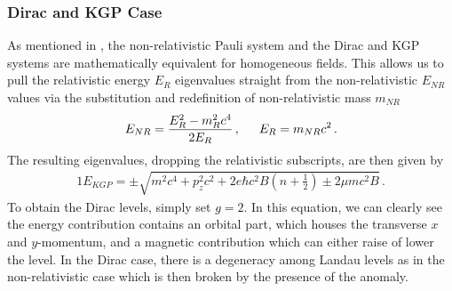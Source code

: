 \subsubsection*{Dirac and KGP Case}\label{ajsss:DKGP}
\noindent As mentioned in , the non-relativistic Pauli system and the Dirac and KGP systems are mathematically equivalent for homogeneous fields. This allows us to pull the relativistic energy $E_{R}$ eigenvalues straight from the non-relativistic $E_{NR}$ values via the substitution and redefinition of non-relativistic mass $m_{NR}$
\begin{alignat}{1}
	\label{eq:DKGP:01} E_{NR} = \frac{E_{R}^{2}-m_{R}^{2}c^{4}}{2E_{R}}\,,\indent  E_{R} = m_{NR}c^{2}\,.
\end{alignat}
The resulting eigenvalues, dropping the relativistic subscripts, are then given by
\begin{alignat}{1}
	\label{eq:DKGP:02} E_{KGP} =\pm\sqrt{m^{2}c^{4}+p_{z}^{2}c^{2}+2e\hbar c^{2}B\left(n+\frac{1}{2}\right)\pm2\mu mc^{2}B}\,.
\end{alignat}
To obtain the Dirac levels, simply set $g=2$. In this equation, we can clearly see the energy contribution contains an orbital part, which houses the transverse $x$ and $y$-momentum, and a magnetic contribution which can either raise of lower the level. In the Dirac case, there is a degeneracy among Landau levels as in the non-relativistic case which is then broken by the presence of the anomaly.

